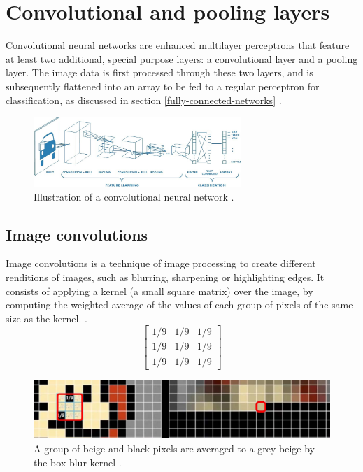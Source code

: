 ﻿\documentclass[12pt,a4paper,notitlepage]{article}
\begin{document}
\section{Convolutional and pooling layers}
Convolutional neural networks are enhanced multilayer perceptrons that feature at least two additional, special purpose layers: a convolutional layer and a pooling layer. The image data is first processed through these two layers, and is subsequently flattened into an array to be fed to a regular perceptron for classification, as discussed in section \ref{fully-connected-networks} \cite{saha_comprehensive_2018}.

\begin{figure}[htbp]
 \centering
  \includegraphics[width=0.70\textwidth]{images/convolutional-neural-network.jpeg}
 \caption{Illustration of a convolutional neural network \cite{saha_comprehensive_2018}.}
 \label{fig:convolutional-neural-network}
\end{figure}
\subsection{Image convolutions}

Image convolutions is a technique of image processing to create different renditions of images, such as blurring, sharpening or highlighting edges. It consists of applying a kernel (a small square matrix) over the image, by computing the weighted average of the values of each group of pixels of the same size as the kernel. \cite{sanderson_convolutions_2020}.
\begin{displaymath}
 \begin{bmatrix}
  1/9 & 1/9 & 1/9 \\
  1/9 & 1/9 & 1/9 \\
  1/9 & 1/9 & 1/9
 \end{bmatrix}
\end{displaymath}
\begin{figure}[htbp]
 \centering
  \includegraphics[width=1.00\textwidth]{images/box-blur.jpg}
 \caption{A group of beige and black pixels are averaged to a grey-beige by the box blur kernel \cite{sanderson_convolutions_2020}.}
 \label{fig:box-blur}
\end{figure}
\end{document}
